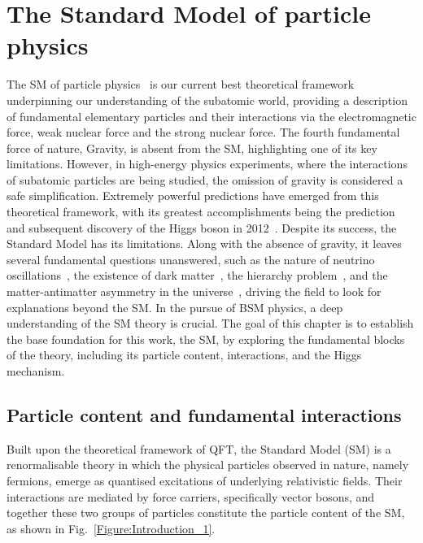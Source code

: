 \chapter{The Standard Model of particle physics}
\thispagestyle{plain}  %
\pagestyle{chapterpages}
\label{Section:Chapter1}
The \ac{SM} of particle physics~\cite{Glashow_StandardModel_1,Weinberg_StandardModel_1,StandardModel_3,Standard_Model4} is our current best theoretical framework underpinning our understanding of the subatomic world, providing a description of fundamental elementary particles and their interactions via the electromagnetic force, weak nuclear force and the strong nuclear force. The fourth fundamental force of nature, Gravity, is absent from the SM, highlighting one of its key limitations. However, in high-energy physics experiments, where the interactions of subatomic particles are being studied, the omission of gravity is considered a safe simplification. Extremely powerful predictions have emerged from this theoretical framework, with its greatest accomplishments being the prediction~\cite{Higgs_1} and subsequent discovery of the Higgs boson in 2012~\cite{Higgs_ATLAS,Higgs_CMS}. Despite its success, the Standard Model has its limitations. Along with the absence of gravity, it leaves several fundamental questions unanswered, such as the nature of neutrino oscillations~\cite{Neutrino_Oscillations}, the existence of dark matter~\cite{DarkMatter}, the hierarchy problem~\cite{HierarchyProblem}, and the matter-antimatter asymmetry in the universe~\cite{MatterAntimatter}, driving the field to look for explanations beyond the SM. In the pursue of \ac{BSM} physics, a deep understanding of the SM theory is crucial. The goal of this chapter is to establish the base foundation for this work, the SM, by exploring the fundamental blocks of the theory, including its particle content, interactions, and the Higgs mechanism.

\section{Particle content and fundamental interactions}
\label{Section:Particle content and fundamental interactions}
Built upon the theoretical framework of QFT, the Standard Model (SM) is a renormalisable theory in which the physical particles observed in nature, namely fermions, emerge as quantised excitations of underlying relativistic fields. Their interactions are mediated by force carriers, specifically vector bosons, and together these two groups of particles constitute the particle content of the SM, as shown in Fig.~\ref{Figure:Introduction_1}.

